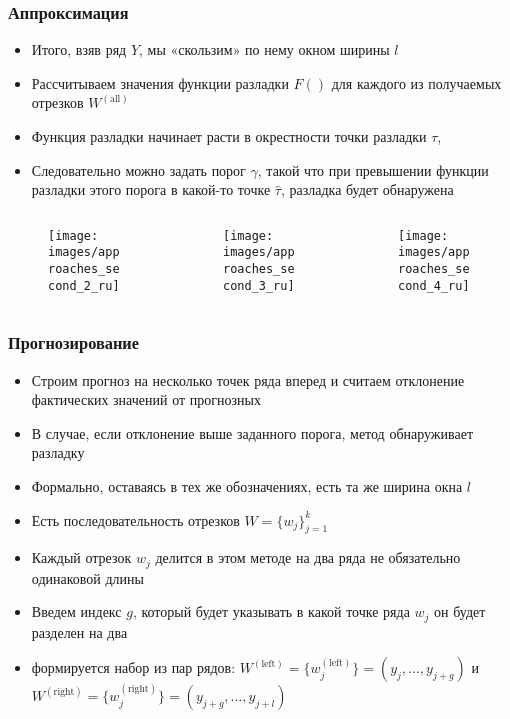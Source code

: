 \documentclass[intlimits, 9pt, unicode]{beamer}
\begin{document}
\begin{frame}
    \frametitle{Аппроксимация}

\begin{itemize}
	\item Итого, взяв ряд $Y$, мы «скользим» по нему окном ширины $l$
	\item Рассчитываем значения функции разладки $F()$ для каждого из получаемых отрезков $W^{\mathrm{(all)}}$
	\item Функция разладки начинает расти в окрестности точки разладки $\tau$,
	\item Следовательно можно задать порог $\gamma$, такой что при превышении функции разладки этого порога в какой-то точке $\hat{\tau}$, разладка будет обнаружена
\end{itemize}

 \begin{columns}
    \begin{column}{0.3\textwidth}
	\begin{figure}
	\texttt{[image: images/approaches\_second\_2\_ru]}
	\end{figure}
     \end{column}
    \begin{column}{0.3\textwidth}
	\begin{figure}
	\texttt{[image: images/approaches\_second\_3\_ru]}
	\end{figure}
    \end{column}
    \begin{column}{0.3\textwidth}
	\begin{figure}
	\texttt{[image: images/approaches\_second\_4\_ru]}
	\end{figure}
    \end{column}
     \end{columns}

\end{frame}


\begin{frame}
    \frametitle{Прогнозирование}

\begin{itemize}
	\item Строим прогноз на несколько точек ряда вперед и считаем отклонение фактических значений от прогнозных
	\item В случае, если отклонение выше заданного порога, метод обнаруживает разладку
	\item Формально, оставаясь в тех же обозначениях, есть та же ширина окна $l$ 
	\item Есть последовательность отрезков $W = \{ w_j \}_{j=1}^k$
	\item  Каждый отрезок  $w_j$ делится в этом методе на два ряда не обязательно одинаковой длины
	\item  Введем индекс $g$, который будет указывать в какой точке ряда $w_j$ он будет разделен на два
	\item  формируется набор из пар рядов:  $ W^{\mathrm{(left)}} = \{w_j^{\mathrm{(left)}} \}  =  (y_j, \dots, y_{j+g})$ и $W^{\mathrm{(right)}} = \{w_j^{\mathrm{(right)}} \} = (y_{j+g}, \dots, y_{j+l})$
\end{itemize}

\end{frame}
\end{document}
